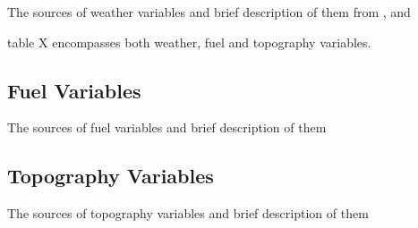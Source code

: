 The sources of weather variables and brief description of them
\cite{Zippenfenig_Open-Meteo} from \cite{Hersbach_ERA5}, \cite{Munoz_ERA5_LAND} and \cite{Schimanke_CERRA}

table X encompasses both weather, fuel and topography variables.




\subsection{Fuel Variables}
The sources of fuel variables and brief description of them

\subsection{Topography Variables}
The sources of topography variables and brief description of them

